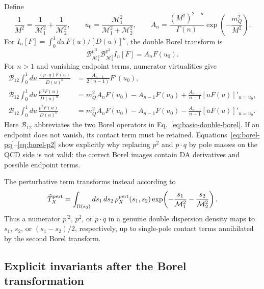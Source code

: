 \documentclass[11pt]{article}
\begin{document}
Define
\begin{equation}
 \frac{1}{M^2}=\frac{1}{\mathcal M_1^2}
                +\frac{1}{\mathcal M_2^2},\qquad
 u_0=\frac{\mathcal M_1^2}{\mathcal M_1^2+\mathcal M_2^2},
 \qquad
 A_n=\frac{(M^2)^{2-n}}{\Gamma(n)}
     \exp\!\left(-\frac{m_Q^2}{M^2}\right).
 \label{eq:double-borel-definitions}
\end{equation}
For
$I_n[F]=\int_0^1du\,F(u)/[D(u)]^n$, the double Borel transform is
\begin{equation}
 \mathcal B_{\mathcal M_1^2}^{p^{\prime2}}
 \mathcal B_{\mathcal M_2^2}^{p^2} I_n[F]
 =A_nF(u_0).
 \label{eq:basic-double-borel}
\end{equation}
For $n>1$ and vanishing endpoint terms, numerator virtualities give
\begin{align}
 \mathcal B_{12}\!\int_0^1du\,
 \frac{(p\cdot q)F(u)}{D(u)^n}
 &=\frac{A_{n-1}}{2(n-1)}F'(u_0),
 \label{eq:borel-pq}\\
 \mathcal B_{12}\!\int_0^1du\,
 \frac{p^{\prime2}F(u)}{D(u)^n}
 &=m_Q^2A_nF(u_0)-A_{n-1}F(u_0)
   +\frac{A_{n-1}}{n-1}[uF(u)]'_{u=u_0},
 \label{eq:borel-pprime2}\\
 \mathcal B_{12}\!\int_0^1du\,
 \frac{p^2F(u)}{D(u)^n}
 &=m_Q^2A_nF(u_0)-A_{n-1}F(u_0)
   -\frac{A_{n-1}}{n-1}[\bar uF(u)]'_{u=u_0}.
 \label{eq:borel-p2}
\end{align}
Here $\mathcal B_{12}$ abbreviates the two Borel operators in
Eq.~\eqref{eq:basic-double-borel}.  If an endpoint does not vanish, its contact
term must be retained.  Equations~\eqref{eq:borel-pq}--\eqref{eq:borel-p2}
show explicitly why replacing $p^2$ and $p\cdot q$ by pole masses on the QCD
side is not valid: the correct Borel images contain DA derivatives and
possible endpoint terms.

The perturbative term transforms instead according to
\begin{equation}
 \widehat T_X^{\rm pert}
 =\int_{\Omega(s_0)}ds_1\,ds_2\,
 \rho_X^{\rm pert}(s_1,s_2)
 \exp\!\left(-\frac{s_1}{\mathcal M_1^2}
             -\frac{s_2}{\mathcal M_2^2}\right).
 \label{eq:borel-double-dispersion}
\end{equation}
Thus a numerator $p^{\prime2}$, $p^2$, or $p\cdot q$ in a genuine double
dispersion density maps to $s_1$, $s_2$, or $(s_1-s_2)/2$, respectively,
up to single-pole contact terms annihilated by the second Borel transform.

\subsection{Explicit invariants after the Borel transformation}
\end{document}
